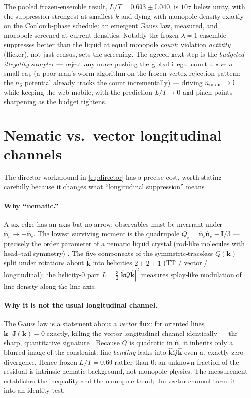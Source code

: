 \documentclass[11pt]{article}
\newcommand{\kh}{\hat{\mathbf k}}
\newcommand{\kv}{\mathbf k}
\newcommand{\nh}{\hat{\mathbf n}}
\begin{document}
The pooled frozen-ensemble result, $L/T = 0.603 \pm 0.040$, is $10\sigma$
below unity, with the suppression strongest at smallest $k$ and dying with
monopole density exactly on the Coulomb-phase schedule: an emergent Gauss
law, measured, and monopole-screened at current densities. Notably the
frozen $\lambda=1$ ensemble suppresses better than the liquid at equal
monopole \emph{count}: violation \emph{activity} (flicker), not just census,
sets the screening. The agreed next step is the \emph{budgeted-illegality
sampler} --- reject any move pushing the global illegal count above a small
cap (a poor-man's worm algorithm \cite{prokofev-svistunov} on the
frozen-vertex rejection pattern; the $n_6$ potential already tracks the
count incrementally) --- driving $n_{\rm mono} \to 0$ while keeping the web
mobile, with the prediction $L/T \to 0$ and pinch points sharpening as the
budget tightens.

\section{Nematic vs.\ vector longitudinal channels}
\label{sec:nematic}

The director workaround in \eqref{eq:director} has a precise cost, worth
stating carefully because it changes what ``longitudinal suppression''
means.

\paragraph{Why ``nematic.''} A six-edge has an axis but no arrow; observables
must be invariant under $\nh_e \to -\nh_e$. The lowest surviving moment is
the quadrupole $Q_e = \nh_e\nh_e - \mathbf I/3$ --- precisely the order
parameter of a nematic liquid crystal (rod-like molecules with head--tail
symmetry) \cite{degennes}. The five components of the symmetric-traceless
$Q(\kv)$ split under rotations about $\kh$ into helicities $2+2+1$
(TT / vector / longitudinal); the helicity-0 part
$L = \tfrac32|\kh Q \kh|^2$ measures splay-like modulation of line density
along the line axis.

\paragraph{Why it is not the usual longitudinal channel.} The Gauss law is a
statement about a \emph{vector} flux: for oriented lines,
$\kv\cdot\mathbf J(\kv) = 0$ exactly, killing the vector-longitudinal
channel identically --- the sharp, quantitative signature
\cite{youngblood-axe}. Because $Q$ is quadratic in $\nh$, it inherits only a
blurred image of the constraint: line \emph{bending} leaks into
$\kh Q \kh$ even at exactly zero divergence. Hence frozen
$L/T = 0.60$ rather than $0$: an unknown fraction of the residual is
intrinsic nematic background, not monopole physics. The measurement
establishes the inequality and the monopole trend; the vector channel turns
it into an identity test.
\end{document}
